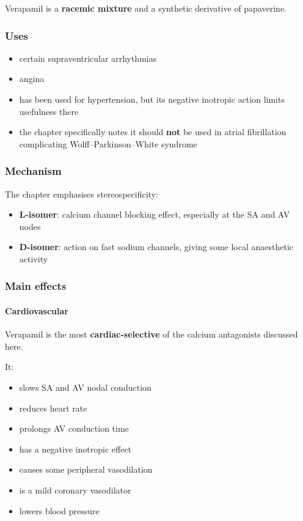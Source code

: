 \documentclass[11pt,a4paper]{article}
\begin{document}
Verapamil is a \textbf{racemic mixture} and a synthetic derivative of papaverine.

\subsubsection*{Uses}
\begin{itemize}
    \item certain supraventricular arrhythmias
    \item angina
    \item has been used for hypertension, but its negative inotropic action limits usefulness there
    \item the chapter specifically notes it should \textbf{not} be used in atrial fibrillation complicating Wolff--Parkinson--White syndrome
\end{itemize}

\subsubsection*{Mechanism}

The chapter emphasises stereospecificity:
\begin{itemize}
    \item \textbf{L-isomer}: calcium channel blocking effect, especially at the SA and AV nodes
    \item \textbf{D-isomer}: action on fast sodium channels, giving some local anaesthetic activity
\end{itemize}

\subsubsection*{Main effects}

\paragraph{Cardiovascular}
Verapamil is the most \textbf{cardiac-selective} of the calcium antagonists discussed here.

It:
\begin{itemize}
    \item slows SA and AV nodal conduction
    \item reduces heart rate
    \item prolongs AV conduction time
    \item has a negative inotropic effect
    \item causes some peripheral vasodilation
    \item is a mild coronary vasodilator
    \item lowers blood pressure
\end{itemize}
\end{document}
